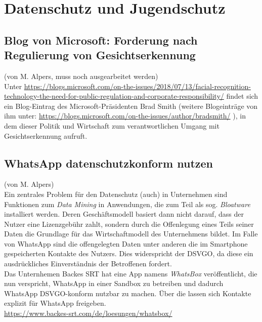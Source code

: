 \section*{Datenschutz und Jugendschutz}

\subsection{Blog von Microsoft: Forderung nach Regulierung von Gesichtserkennung}
(von M. Alpers, muss noch ausgearbeitet werden)\\

Unter \url{https://blogs.microsoft.com/on-the-issues/2018/07/13/facial-recognition-technology-the-need-for-public-regulation-and-corporate-responsibility/} findet sich ein Blog-Eintrag des Microsoft-Präsidenten Brad Smith (weitere Blogeinträge von ihm unter: \url{https://blogs.microsoft.com/on-the-issues/author/bradsmith/} ), in dem dieser Politik und Wirtschaft zum verantwortlichen Umgang mit Gesichtserkennung aufruft.

\subsection{WhatsApp datenschutzkonform nutzen}
(von M. Alpers)\\

Ein zentrales Problem für den Datenschutz (auch) in Unternehmen sind Funktionen zum \emph{Data Mining} in Anwendungen, die zum Teil als sog. \emph{Bloatware} installiert werden. Deren Geschäftsmodell basiert dann nicht darauf, dass der Nutzer eine Lizenzgebühr zahlt, sondern durch die Offenlegung eines Teils seiner Daten die Grundlage für das Wirtschaftmodell des Unternehmens bildet. Im Falle von WhatsApp sind die offengelegten Daten unter anderen die im Smartphone gespeicherten Kontakte des Nutzers. Dies widerspricht der DSVGO, da diese ein ausdrückliches Einverständnis der Betroffenen fordert.\\

\glqq{}Das Unternhemen  Backes SRT hat eine App namens \emph{WhatsBox} veröffentlicht,\grqq{} die nun verspricht, WhatsApp in einer Sandbox zu betreiben und dadurch WhatsApp DSVGO-konform nutzbar zu machen. Über die lassen sich Kontakte explizit für WhatsApp freigeben.\\

\url{https://www.backes-srt.com/de/loesungen/whatsbox/}